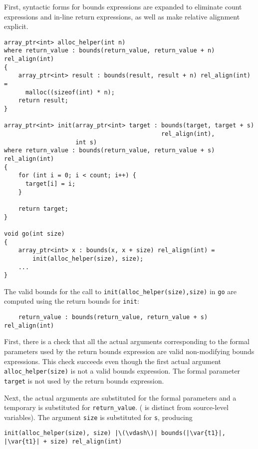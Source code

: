 First, syntactic forms for bounds expressions are expanded to eliminate
count expressions and in-line return expressions, as well as make
relative alignment explicit.

\begin{lstlisting}
array_ptr<int> alloc_helper(int n)
where return_value : bounds(return_value, return_value + n) rel_align(int)
{
    array_ptr<int> result : bounds(result, result + n) rel_align(int) =
      malloc((sizeof(int) * n);
    return result;
}

array_ptr<int> init(array_ptr<int> target : bounds(target, target + s)
                                            rel_align(int), 
                    int s) 
where return_value : bounds(return_value, return_value + s) rel_align(int)
{
    for (int i = 0; i < count; i++) {
      target[i] = i;
    }

    return target;
}

void go(int size) 
{
    array_ptr<int> x : bounds(x, x + size) rel_align(int) = 
        init(alloc_helper(size), size);
    ...
}
\end{lstlisting}

The valid bounds for the call to \lstinline|init(alloc_helper(size),size)| in
\lstinline|go| are computed using the return bounds for \lstinline|init|:

\begin{lstlisting}
    return_value : bounds(return_value, return_value + s) rel_align(int)
\end{lstlisting}

First, there is a check that all the actual arguments corresponding to
the formal parameters used by the return bounds expression are valid
non-modifying bounds expressions.   This check succeeds even though the
first actual argument \lstinline|alloc_helper(size)| is not a valid bounds
expression. The formal parameter \lstinline|target| is not used by the
return bounds expression.

Next, the actual arguments are substituted for the formal parameters and
a temporary  is substituted for \lstinline|return_value|.
( is distinct from source-level variables).
The argument \lstinline|size| is substituted for \lstinline|s|, producing
\begin{lstlisting}[escapechar=\|]
    init(alloc_helper(size), size) |\(\vdash\)| bounds(|\var{t1}|, |\var{t1}| + size) rel_align(int)
\end{lstlisting}


